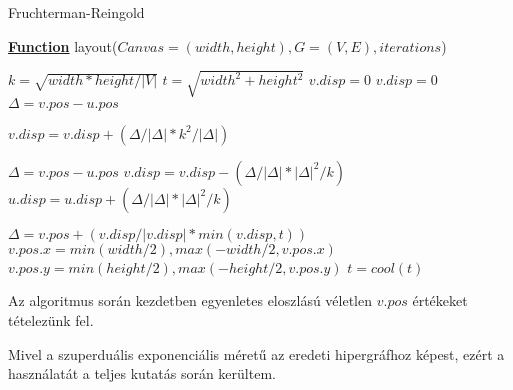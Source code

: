 \begin{algorithm}[H]
\caption{Fruchterman-Reingold}
\label{alg:fruchterman} 
\textbf{\underline{Function}} layout($Canvas=(width, height), G=(V,E), iterations$)
\begin{algorithmic}[1]
\STATE $k = \sqrt{width*height/|V|}$
\STATE $t = \sqrt{width^2+height^2}$ 
	 
		\STATE $v.disp = 0$
				\STATE $v.disp = 0$
				\STATE $\Delta = v.pos - u.pos$
\end{algorithmic}
\end{algorithm}

\begin{algorithm}[H]
\begin{algorithmic}[1]
				\STATE $v.disp = v.disp + (\Delta/|\Delta|*k^2/|\Delta|)$
			\ENDIF
		\ENDFOR
	\ENDFOR
	
	
	 
		\STATE $\Delta = v.pos - u.pos$
		\STATE $v.disp = v.disp - (\Delta/|\Delta|*|\Delta|^2/k)$
		\STATE $u.disp = u.disp + (\Delta/|\Delta|*|\Delta|^2/k)$
	\ENDFOR

		\STATE $\Delta = v.pos + (v.disp/|v.disp|*min(v.disp,t))$ 
		\STATE $v.pos.x = min(width/2), max(-width/2, v.pos.x)$ 
		\STATE $v.pos.y = min(height/2), max(-height/2, v.pos.y)$
	\ENDFOR
	\STATE $t = cool(t)$ 
\ENDFOR
\end{algorithmic}
\end{algorithm}

Az algoritmus során kezdetben egyenletes eloszlású véletlen $v.pos$ értékeket tételezünk fel.


\begin{note}
Mivel a szuperduális exponenciális méretű az eredeti hipergráfhoz képest, ezért a használatát a teljes kutatás során kerültem.
\end{note}

